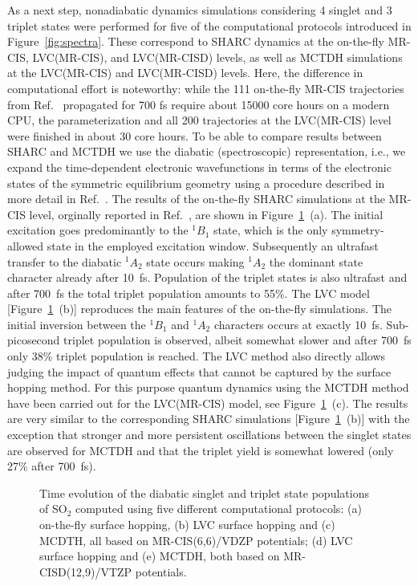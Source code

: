 \documentclass[twoside,twocolumn,9pt]{article}
\begin{document}
As a next step, nonadiabatic dynamics simulations considering 4 singlet and 3 triplet states were performed for five of the computational protocols introduced in Figure~\ref{fig:spectra}.
These correspond to SHARC dynamics at the on-the-fly MR-CIS, LVC(MR-CIS), and LVC(MR-CISD) levels, as well as MCTDH simulations at the LVC(MR-CIS) and LVC(MR-CISD) levels.
Here, the difference in computational effort is noteworthy: while the 111 on-the-fly MR-CIS trajectories from Ref.~ propagated for 700 fs require about 15000 core hours on a modern CPU, the parameterization and all 200 trajectories at the LVC(MR-CIS) level were finished in about 30 core hours.
To be able to compare results between SHARC and MCTDH we use the diabatic (spectroscopic) representation,\cite{Mai2015} i.e., we expand the time-dependent electronic wavefunctions in terms of the electronic states of the symmetric equilibrium geometry using a procedure described in more detail in Ref.~.
The results of the on-the-fly SHARC simulations at the MR-CIS level, orginally reported in Ref.~, are shown in Figure~\ref{fig:dyn}~(a).
The initial excitation goes predominantly to the $^1B_1$ state, which is the only symmetry-allowed state in the employed excitation window.
Subsequently an ultrafast transfer to the diabatic $^1A_2$ state occurs making $^1A_2$ the dominant state character already after 10~fs.
Population of the triplet states is also ultrafast and after 700~fs the total triplet population amounts to 55\%.
The LVC model [Figure~\ref{fig:dyn}~(b)] reproduces the main features of the on-the-fly simulations.
The initial inversion between the $^1B_1$ and $^1A_2$ characters occurs at exactly 10~fs.
Sub-picosecond triplet population is observed, albeit somewhat slower and after 700~fs only 38\% triplet population is reached.
The LVC method also directly allows judging the impact of quantum effects that cannot be captured by the surface hopping method.
For this purpose quantum dynamics using the MCTDH method have been carried out for the LVC(MR-CIS) model, see Figure~\ref{fig:dyn}~(c).
The results are very similar to the corresponding SHARC simulations [Figure~\ref{fig:dyn}~(b)] with the exception that stronger and more persistent oscillations between the singlet states are observed for MCTDH and that the triplet yield is somewhat lowered (only 27\% after 700~fs).

\begin{figure}[bth!]
\caption{Time evolution of the diabatic singlet and triplet state populations of SO$_2$  computed using five different computational protocols: (a) on-the-fly surface hopping, (b) LVC surface hopping and (c) MCDTH, all based on MR-CIS(6,6)/VDZP potentials; (d) LVC surface hopping and (e) MCTDH, both based on MR-CISD(12,9)/VTZP potentials.}
\label{fig:dyn}
\end{figure}
\end{document}
